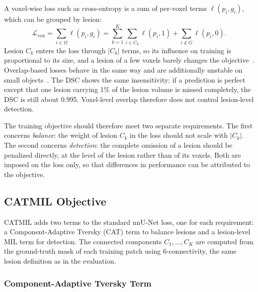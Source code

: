 A voxel-wise loss such as cross-entropy is a sum of per-voxel terms
$\ell(p_i, g_i)$, which can be grouped by lesion:
\begin{equation}
\mathcal{L}_{\mathrm{vox}}
=
\sum_{i \in \Omega} \ell(p_i, g_i)
=
\sum_{k=1}^{K} \sum_{i \in C_k} \ell(p_i, 1)
+
\sum_{i \notin G} \ell(p_i, 0) .
\label{eq:sl_voxel_loss}
\end{equation}
Lesion $C_k$ enters the loss through $|C_k|$ terms, so its influence on
training is proportional to its size, and a lesion of a few voxels barely
changes the objective~\cite{kofler_blob_2023}. Overlap-based losses behave
in the same way and are additionally unstable on small
objects~\cite{azad_loss_2023}. The DSC shows the same insensitivity: if a
prediction is perfect except that one lesion carrying 1\% of the lesion
volume is missed completely, the DSC is still about 0.995. Voxel-level
overlap therefore does not control lesion-level detection.

The training objective should therefore meet two separate requirements.
The first concerns \emph{balance}: the weight of lesion $C_k$ in the loss
should not scale with $|C_k|$. The second concerns \emph{detection}: the
complete omission of a lesion should be penalized directly, at the level of
the lesion rather than of its voxels. Both are imposed on the loss only, so
that differences in performance can be attributed to the objective.

\subsection{CATMIL Objective}

CATMIL adds two terms to the standard nnU-Net loss, one for each
requirement: a Component-Adaptive Tversky (CAT) term to balance lesions and
a lesion-level MIL term for detection. The connected components
$C_1,\ldots,C_K$ are computed from the ground-truth mask of each training
patch using 6-connectivity, the same lesion definition as in the
evaluation.

\subsubsection{Component-Adaptive Tversky Term}

